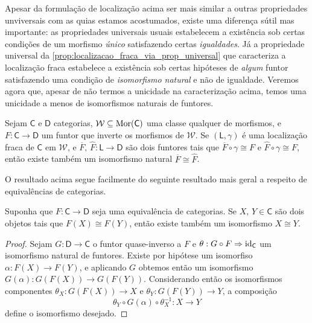 Apesar da formulação de localização acima ser mais similar a outras propriedades unviversais com as quias estamos acostumados, existe uma diferença sútil mas importante: as propriedades universais usuais estabelecem a existência sob certas condições de um morfismo \emph{único} satisfazendo certas \emph{igualdades}.
Já a propriedade universal da \cref{prop:localizacao_fraca_via_prop_universal} que caracteriza a localização fraca estabelece a existência sob certas hipóteses de \emph{algum} funtor satisfazendo uma condição de \emph{isomorfismo natural} e não de igualdade.
Veremos agora que, apesar de não termos a unicidade na caracterização acima, temos uma unicidade a menos de isomorfismos naturais de funtores.

\begin{prop}\label{prop:unicidade_fraca_funtor_induzido_localizacao_fraca}
  Sejam $\mathsf{C}$ e $\mathsf{D}$ categorias, $\mathcal{W} \subseteq \mathrm{Mor}(\mathsf{C})$ uma classe qualquer de morfismos, e $F: \mathsf{C} \to \mathsf{D}$ um funtor que inverte os morfismos de $\mathcal{W}$.
  Se $(\mathsf{L},\gamma)$ é uma localização fraca de $\mathsf{C}$ em $\mathcal{W}$, e $\overline{F},\,\widehat{F}: \mathsf{L} \to \mathsf{D}$ são dois funtores tais que $\overline{F} \circ \gamma \cong F$ e $\widehat{F} \circ \gamma \cong F$, então existe também um isomorfismo natural $\overline{F} \cong \widehat{F}$.
\end{prop}

O resultado acima segue facilmente do seguinte resultado mais geral a respeito de equivalências de categorias.

\begin{lema}\label{lema:equiv_categorias_quase_injetivo}
  Suponha que $F: \mathsf{C} \to \mathsf{D}$ seja uma equivalência de categorias.
  Se $X,\, Y \in \mathsf{C}$ são dois objetos tais que $F(X) \cong F(Y)$, então existe também um isomorfismo $X \cong Y$.
\end{lema}

\begin{proof}
   Sejam $G: \mathsf{D} \to \mathsf{C}$ o funtor quase-inverso a $F$ e $\theta: G \circ F \Rightarrow \mathrm{id}_{\mathsf{C}}$ um isomorfismo natural de funtores.
  Existe por hipótese um isomorfiso $\alpha: F(X) \to F(Y)$, e aplicando $G$ obtemos então um isomorfismo $G(\alpha): G(F(X)) \to G(F(Y))$.
  Considerando então os isomorfismos componentes $\theta_{X}: G(F(X)) \to X$ e $\theta_{Y}: G(F(Y)) \to Y$, a composição
  \begin{displaymath}
    \theta_{Y} \circ G(\alpha) \circ \theta_{X}^{-1}: X \to Y
  \end{displaymath}
  define o isomorfismo desejado.
\end{proof}

